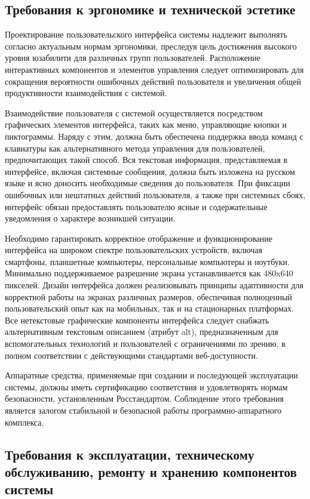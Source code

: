 \subsection{Требования к эргономике и технической эстетике}

Проектирование пользовательского интерфейса системы надлежит выполнять согласно актуальным нормам эргономики, преследуя цель достижения высокого уровня юзабилити для различных групп пользователей. Расположение интерактивных компонентов и элементов управления следует оптимизировать для сокращения вероятности ошибочных действий пользователя и увеличения общей продуктивности взаимодействия с системой.

Взаимодействие пользователя с системой осуществляется посредством графических элементов интерфейса, таких как меню, управляющие кнопки и пиктограммы. Наряду с этим, должна быть обеспечена поддержка ввода команд с клавиатуры как альтернативного метода управления для пользователей, предпочитающих такой способ. Вся текстовая информация, представляемая в интерфейсе, включая системные сообщения, должна быть изложена на русском языке и ясно доносить необходимые сведения до пользователя. При фиксации ошибочных или нештатных действий пользователя, а также при системных сбоях, интерфейс обязан предоставлять пользователю ясные и содержательные уведомления о характере возникшей ситуации.

Необходимо гарантировать корректное отображение и функционирование интерфейса на широком спектре пользовательских устройств, включая смартфоны, планшетные компьютеры, персональные компьютеры и ноутбуки. Минимально поддерживаемое разрешение экрана устанавливается как 480x640 пикселей. Дизайн интерфейса должен реализовывать принципы адаптивности для корректной работы на экранах различных размеров, обеспечивая полноценный пользовательский опыт как на мобильных, так и на стационарных платформах. Все нетекстовые графические компоненты интерфейса следует снабжать альтернативным текстовым описанием (атрибут alt), предназначенным для вспомогательных технологий и пользователей с ограничениями по зрению, в полном соответствии с действующими стандартами веб-доступности.

Аппаратные средства, применяемые при создании и последующей эксплуатации системы, должны иметь сертификацию соответствия и удовлетворять нормам безопасности, установленным Росстандартом. Соблюдение этого требования является залогом стабильной и безопасной работы программно-аппаратного комплекса.

\subsection{Требования к эксплуатации, техническому обслуживанию, ремонту и хранению компонентов системы}

